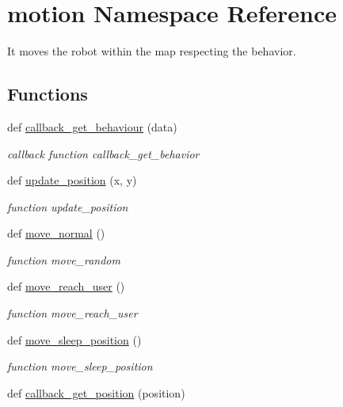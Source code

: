 \hypertarget{namespacemotion}{}\section{motion Namespace Reference}
\label{namespacemotion}


It moves the robot within the map respecting the behavior.  


\subsection*{Functions}
\begin{DoxyCompactItemize}
\item 
def \hyperlink{namespacemotion_a223e65905edcd5f4605198efb23d2ca3}{callback\+\_\+get\+\_\+behaviour} (data)
\begin{DoxyCompactList}\small\item\em callback function callback\+\_\+get\+\_\+behavior \end{DoxyCompactList}\item 
def \hyperlink{namespacemotion_a9a93c5fd6c8938302c99cdc865f34cb8}{update\+\_\+position} (x, y)
\begin{DoxyCompactList}\small\item\em function update\+\_\+position \end{DoxyCompactList}\item 
def \hyperlink{namespacemotion_ab5144d84b423263e4fa8c03c453d975c}{move\+\_\+normal} ()
\begin{DoxyCompactList}\small\item\em function move\+\_\+random \end{DoxyCompactList}\item 
def \hyperlink{namespacemotion_ab22dd13019d977ca14ccf9a84d7f224a}{move\+\_\+reach\+\_\+user} ()
\begin{DoxyCompactList}\small\item\em function move\+\_\+reach\+\_\+user \end{DoxyCompactList}\item 
def \hyperlink{namespacemotion_a7e28371ac015cdd23c39095626abce98}{move\+\_\+sleep\+\_\+position} ()
\begin{DoxyCompactList}\small\item\em function move\+\_\+sleep\+\_\+position \end{DoxyCompactList}\item 
def \hyperlink{namespacemotion_aea14bdb6100f2e8e6035a4487c861bc7}{callback\+\_\+get\+\_\+position} (position)

\end{DoxyCompactItemize}
